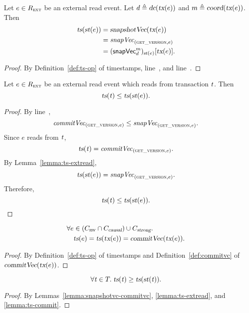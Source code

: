 \begin{applemma} \label{lemma:ts-extread}
  Let $e \in R_{\textsc{ext}}$ be an external read event.
  Let $d \triangleq \textsl{dc}(\textsl{tx}(e))$ and $m \triangleq \textsl{coord}(\textsl{tx}(e))$.
  Then
  \begin{align*}
    \textsl{ts}(\textsl{st}(e)) &= \textsl{snapshotVec}(\textsl{tx}(e)) \\
                  &= \mathit{snapVec}_{(\textsc{get\_version}, e)} \\
                  &= ({\sf snapVec}^{m}_{d})_{\textsl{st}(e)}[\textsl{tx}(e)].
  \end{align*}
\end{applemma}

\begin{proof} \label{proof:ts-extread}
  By Definition~\ref{def:ts-op} of timestamps,
  line~\code{\ref{alg:unistore-coord}}{\ref{line:doread-from-snapshot}},
  and line~\code{\ref{alg:unistore-coord}}{\ref{line:start-snapvc-d}}.
\end{proof}

\begin{applemma} \label{lemma:rf-ts}
  Let $e \in R_{\textsc{ext}}$ be an external read event
  which reads from transaction $\mathit{t}$. Then
  \[
    \textsl{ts}(\mathit{t}) \le \textsl{ts}(\textsl{st}(e)).
  \]
\end{applemma}

\begin{proof} \label{proof:rf-ts}
  By line~\code{\ref{alg:unistore-replica}}{\ref{line:readkey-read}},
  \[
    \mathit{commitVec}_{(\textsc{get\_version}, e)} \le \mathit{snapVec}_{(\textsc{get\_version}, e)}.
  \]
  Since $e$ reads from $\mathit{t}$,
  \[
    \textsl{ts}(\mathit{t}) = \mathit{commitVec}_{(\textsc{get\_version}, e)}.
  \]
  By Lemma~\ref{lemma:ts-extread},
  \[
    \textsl{ts}(\textsl{st}(e)) = \mathit{snapVec}_{(\textsc{get\_version}, e)}.
  \]
  Therefore,
  \[
    \textsl{ts}(\mathit{t}) \le \textsl{ts}(\textsl{st}(e)).
  \]
\end{proof}


\begin{applemma} \label{lemma:ts-commit}
  \begin{align*}
    &\forall e \in (C_{\textsc{rw}} \cap C_{\textsl{causal}})
      \cup C_{\textsl{strong}}.\; \\
      &\quad \textsl{ts}(e) = \textsl{ts}(\textsl{tx}(e))
                           = \textsl{commitVec}(\textsl{tx}(e)).
  \end{align*}
\end{applemma}

\begin{proof} \label{proof:ts-commit}
  By Definition~\ref{def:ts-op} of timestamps
  and Definition~\ref{def:commitvc} of $\textsl{commitVec}(\textsl{tx}(e))$.
\end{proof}

\begin{applemma} \label{lemma:ts-tid-st-tid}
  \[
    \forall \mathit{t} \in T.\; \textsl{ts}(\mathit{t}) \ge \textsl{ts}(\textsl{st}(\mathit{t})).
  \]
\end{applemma}

\begin{proof} \label{proof:ts-tid-st-tid}
  By Lemmas~\ref{lemma:snapshotvc-commitvc}, \ref{lemma:ts-extread},
  and \ref{lemma:ts-commit}.
\end{proof}
